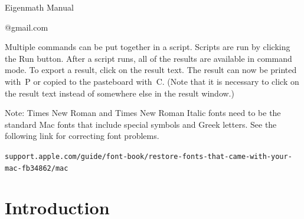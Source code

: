\documentclass[12pt]{article}
\begin{document}
\newpage
\begin{center}
{\LARGE Eigenmath Manual}

@gmail.com
\end{center}

\begin{center}
\end{center}

Multiple commands can be put together in a script.
Scripts are run by clicking the Run button.
After a script runs, all of the results are available in command mode.
To export a result, click on the result text.
The result can now be printed with \cmd$\,$P or copied to the pasteboard with \cmd$\,$C.
(Note that it is necessary to click on the result text
instead of somewhere else in the result window.)

\bigskip
Note: Times New Roman and Times New Roman Italic fonts need
to be the standard Mac fonts that include special symbols and Greek letters.
See the following link for correcting font problems.

\bigskip
{\footnotesize\verb$support.apple.com/guide/font-book/restore-fonts-that-came-with-your-mac-fb34862/mac$}

\newpage
\tableofcontents

\newpage

\section{Introduction}
\end{document}
